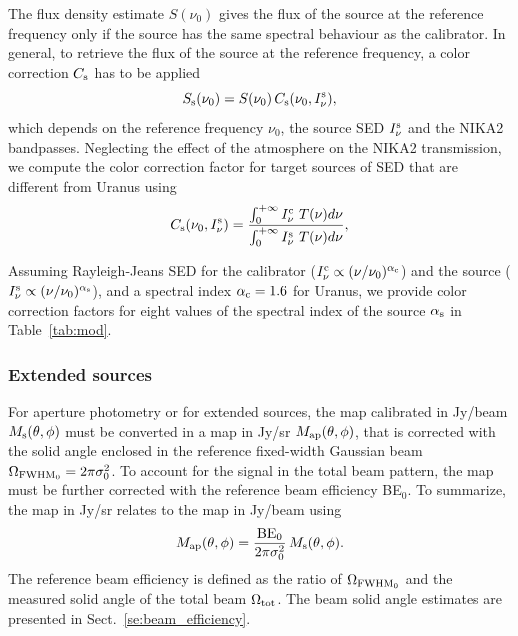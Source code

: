 The flux density estimate $S(\nu_{0})$ gives the
flux of the source at the reference frequency only if the source has
the same spectral behaviour as the calibrator. In general, to retrieve the
flux of the source at the reference frequency, a color correction
$C_{\rm{s}}$ has to be applied
\begin{equation}
S_{\rm{s}}(\nu_{0}) = S(\nu_{0}) \,  C_{\rm{s}}(\nu_{0}, I_\nu^{\rm{s}}),
\end{equation}
which depends on the reference frequency $\nu_{0}$, the source
SED $I_\nu^{\rm{s}}$ and the NIKA2 bandpasses.
Neglecting the effect of the atmosphere on the NIKA2 transmission, we
compute the color correction factor for target sources of SED that are
different from Uranus using
\begin{equation}
  C_{\rm{s}}(\nu_{0}, I_\nu^{\rm{s}}) = \frac{\int_{0}^{+\infty} I_\nu^{\rm{c}}~T({\nu}) d\nu}{ \int_{0}^{+\infty} I_\nu^{\rm{s}}~ T({\nu}) d\nu},
    \label{eq:color_correction}
\end{equation}

Assuming Rayleigh-Jeans SED for the calibrator
($I_\nu^{\rm{c}} \propto (\nu/\nu_0)^{\alpha_{\rm{c}}}$) and the source
($I_\nu^{\rm{s}} \propto (\nu/\nu_0)^{\alpha_{\rm{s}}}$), and a
spectral index $\alpha_{\rm{c}} = 1.6$ for Uranus, we provide color
correction factors for eight values of the spectral index of the
source $\alpha_{\rm{s}}$ in Table~\ref{tab:mod}.


\subsubsection{Extended sources}
\label{se:extended_source_calib}

{\lp For aperture photometry or for extended sources, the map calibrated in
Jy/beam $M_{\rm{s}}(\theta, \phi)$ must be converted in a
map in Jy/sr $M_{\rm{ap}}(\theta, \phi)$, that is corrected
with the solid angle enclosed in the reference fixed-width Gaussian
beam $\Omega_{\rm{FWHM}_{0}} = 2\pi \sigma_0^2$. To account for the
signal in the total beam pattern, the map must be further corrected
with the reference beam efficiency BE$_{0}$. To summarize, the map in
Jy/sr relates to the map in Jy/beam using 
\begin{equation}
M_{\rm{ap}}(\theta, \phi) = \frac{\rm{BE}_{0}}{2\pi \sigma_0^2} \, M_{\rm{s}}(\theta, \phi).
\end{equation}}
The reference beam efficiency is defined as the ratio of 
$\Omega_{\rm{FWHM}_{0}}$ and the measured solid angle of the total
beam $\Omega_{\rm{tot}}$.
The beam solid angle estimates are presented in
Sect.~\ref{se:beam_efficiency}.

